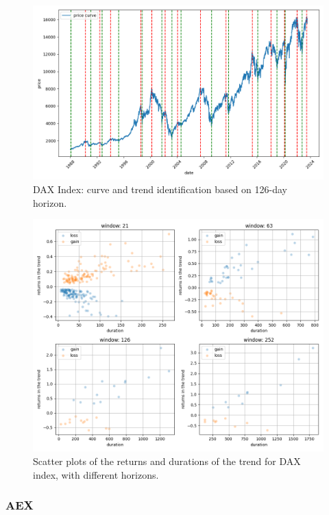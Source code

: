 \begin{figure}[h]
	\centering
	\includegraphics[width=0.8\linewidth]{chapters/chapter1/figures/curve_GDAXI_126D}
	\caption{DAX Index: curve and trend identification based on 126-day horizon.}
	\label{fig:curvegdaxi126d}
\end{figure}

\begin{figure}[h]
	\centering
	\includegraphics[width=1\linewidth]{chapters/chapter1/figures/scatter_GDAXI}
	\caption{Scatter plots of the returns and durations of the trend for DAX index, with different horizons.}
	\label{fig:scattergdaxi}
\end{figure}


\subsubsection{AEX}


